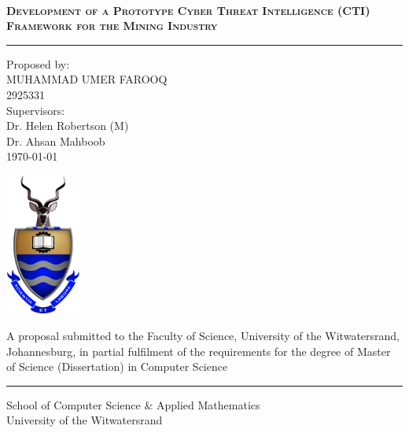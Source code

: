 \documentclass[a4paper,twoside,12pt]{report}
\begin{document}
\onecolumn
\thispagestyle{empty}

\setcounter{page}{0}
\ 
\begin{center}
  \vfill
  {
  \huge \bf \textsc{Development of a Prototype Cyber Threat Intelligence (CTI) Framework for the Mining Industry}\\
  \rule{\linewidth}{0.5pt}
  \normalsize
  Proposed by:\\
  MUHAMMAD UMER FAROOQ\\
  2925331\\[20pt]
  Supervisors:\\[10pt]
  Dr. Helen Robertson (M)\\[10pt]
  Dr. Ahsan Mahboob\\[10pt]
  \today
  }
  \vfill

  \vfill
  \includegraphics[width=2.5cm]{images/wits.png}
  \vfill
  \vfill

  \small{A proposal submitted to the Faculty of Science, University of the Witwatersrand, Johannesburg,
in partial fulfilment of the requirements for the degree of Master of Science (Dissertation) in Computer Science}\\
\rule{\linewidth}{0.5pt}
\large School of Computer Science \& Applied Mathematics\\
\large University of the Witwatersrand\\[20pt]

\end{center}
\vfill
\newpage

\pagestyle{plain}
\setcounter{page}{1}
\end{document}
